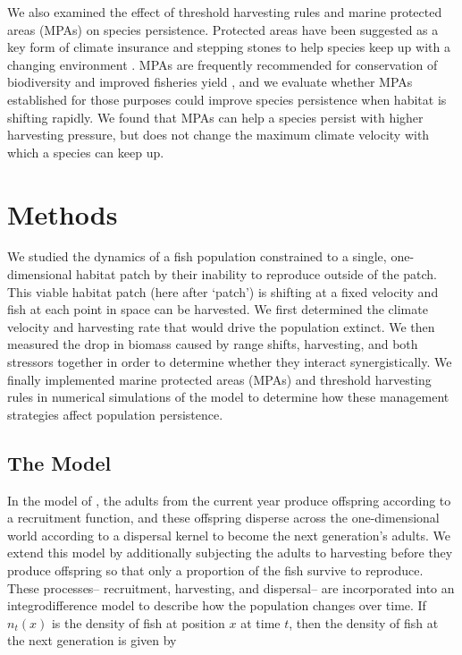 \documentclass[12pt,english]{article}
\begin{document}
\begin{spacing}{1.9}
\begin{flushleft}
We also examined the effect of threshold harvesting rules and marine protected areas (MPAs) on species persistence. Protected areas have been suggested as a key form of climate insurance and stepping stones to help species keep up with a changing environment \citep{Thomasetal2012, Hannahetal2007}. MPAs are frequently recommended for conservation of biodiversity and improved fisheries yield \citep{Gainesetal2010}, and we evaluate whether MPAs established for those purposes could improve species persistence when habitat is shifting rapidly. We found that MPAs can help a species persist with higher harvesting pressure, but does not change the maximum climate velocity with which a species can keep up.

\section{Methods}

We studied the dynamics of a fish population constrained to a single, one-dimensional habitat patch by their inability to reproduce outside of the patch.  This viable habitat patch (here after `patch') is shifting at a fixed velocity and fish at each point in space can be harvested.  We first determined the climate velocity and harvesting rate that would drive the population extinct.  We then measured the drop in biomass caused by range shifts, harvesting, and both stressors together in order to determine whether they interact synergistically.    We finally implemented marine protected areas (MPAs) and threshold harvesting rules in numerical simulations of the model to determine how these management strategies affect population persistence.

\subsection{The Model }

In the model of \cite{ZhouKot2011}, the adults from the current year produce offspring according to a recruitment function, and these offspring disperse across the one-dimensional world according to a dispersal kernel to become the next generation's adults.  We extend this model by additionally subjecting the adults to harvesting before they produce offspring so that only a proportion of the fish survive to reproduce. These processes-- recruitment, harvesting, and dispersal-- are incorporated into an integrodifference model to describe how the population changes over time. If $n_t(x)$ 
is the density of fish at position $x$ at time $t$, then the density of fish at the next generation is given by


\end{flushleft}
\end{spacing}
\end{document}
